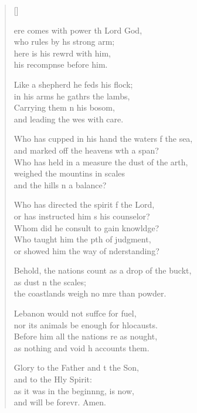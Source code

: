 \settowidth{\versewidth}{Behold, the nations count as a drop of the bucket, +}
\begin{verse}[\versewidth]
  \begin{patverse}
ere comes with power th Lord God,\Med\\
who rules by h\pointup{\i}s strong arm;\\
here is his rewrd with him,\Med\\
his recompnse before him.

Like a shepherd he feds his flock;\Med\\
in his arms he gathrs the lambs,\\
Carrying them \pointup{\i}n his bosom,\Med\\
and leading the wes with care.

Who has cupped in his hand the waters f the sea,\Med\\
and marked off the heavens w\pointup{\i}th a span?\\
Who has held in a measure the dust of the arth,\Flex\\
weighed the mountins in scales\Med\\
and the hills \pointup{\i}n a balance?

Who has directed the spirit f the Lord,\Med\\
or has instructed him s his counselor?\\
Whom did he consult to gain knowldge?\Flex\\
Who taught him the pth of judgment,\Med\\
or showed him the way of nderstanding?

Behold, the nations count as a drop of the buckt,\Flex\\
as dust n the scales;\Med\\
the coastlands weigh no mre than powder.

Lebanon would not suff\pointup{\i}ce for fuel,\Med\\
nor its animals be enough for hlocausts.\\
Before him all the nations re as nought,\Med\\
as nothing and void h accounts them.

Glory to the Father and t the Son,\Med\\
and to the Hly Spirit:\\
as it was in the beginn\pointup{\i}ng, is now,\Med\\
and will be forevr. Amen.
  \end{patverse}
\end{verse}
